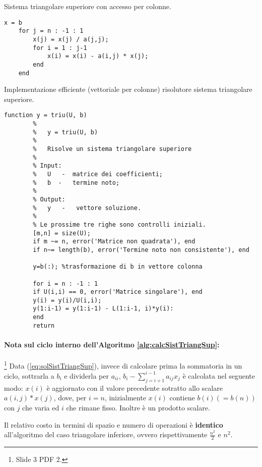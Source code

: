 \begin{algorithm}\caption{Sistema triangolare superiore con accesso per colonne.}
\label{alg:calcSistTriangSup1}
    \begin{lstlisting}[style=Matlab-editor]
    x = b
    for j = n : -1 : 1
        x(j) = x(j) / a(j,j);
        for i = 1 : j-1
            x(i) = x(i) - a(i,j) * x(j);
        end
    end
    \end{lstlisting}
\end{algorithm}

\begin{algorithm}
	\caption{Implementazione efficiente (vettoriale per colonne) risolutore sistema triangolare superiore.}\label{alg:triu}
	\begin{lstlisting}[style=Matlab-editor]
		function y = triu(U, b)
		%   
		%   y = triu(U, b)
		%
		%   Risolve un sistema triangolare superiore
		%
		% Input:
		%   U   -  matrice dei coefficienti;
		%   b  -   termine noto;
		%   
		% Output:
		%   y   -   vettore soluzione.
		%
		% Le prossime tre righe sono controlli iniziali.
		[m,n] = size(U);
		if m ~= n, error('Matrice non quadrata'), end
		if n~= length(b), error('Termine noto non consistente'), end
		
		y=b(:); %trasformazione di b in vettore colonna
		
		for i = n : -1 : 1
		if U(i,i) == 0, error('Matrice singolare'), end
		y(i) = y(i)/U(i,i);
		y(1:i-1) = y(1:i-1) - L(1:i-1, i)*y(i):
		end
		return
	\end{lstlisting}
\end{algorithm}

\paragraph{Nota sul ciclo interno dell'Algoritmo \ref{alg:calcSistTriangSup}:} \footnote{Slide 3 PDF 2.}
Data (\ref{eq:solSistTriangSup}), invece di calcolare prima la sommatoria in un ciclo, sottrarla a $b_i$ e dividerla per $a_{ii},\, b_i-\sum_{j=i+1}^{i-1}a_{ij}x_j$ è calcolata nel seguente modo: $x(i)$ è aggiornato con il valore precedente sotratto allo scalare $a(i,j)*x(j)$, dove, per $i=n$, inizialmente $x(i)$ contiene $b(i)(=b(n))$ con $j$ che varia ed $i$ che rimane fisso. Inoltre è un prodotto scalare.

Il relativo costo in termini di spazio e numero di operazioni è \textbf{identico} all'algoritmo del caso triangolare inferiore, ovvero rispettivamente $\frac{n^2}{2}$ e $n^2$. 

